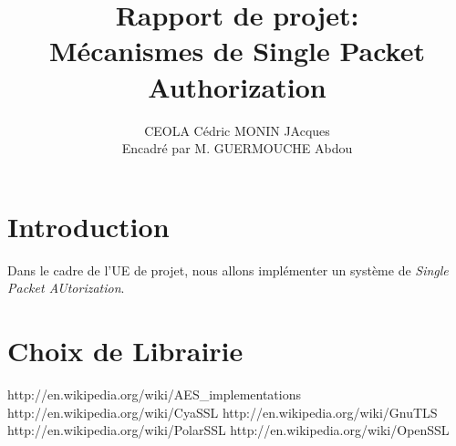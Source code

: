\documentclass[12pt]{article}
\title{Rapport de projet:\\
Mécanismes de Single Packet Authorization}
\author{CEOLA Cédric MONIN JAcques\\
Encadré par M. GUERMOUCHE Abdou}
\begin{document}
\maketitle

\clearpage                  
\tableofcontents
\clearpage

\section{Introduction}

Dans le cadre de l'UE de projet, nous allons implémenter un système de \emph{Single Packet AUtorization}.
\section{Choix de Librairie}
http://en.wikipedia.org/wiki/AES_implementations
http://en.wikipedia.org/wiki/CyaSSL
http://en.wikipedia.org/wiki/GnuTLS
http://en.wikipedia.org/wiki/PolarSSL
http://en.wikipedia.org/wiki/OpenSSL
\end{document}
